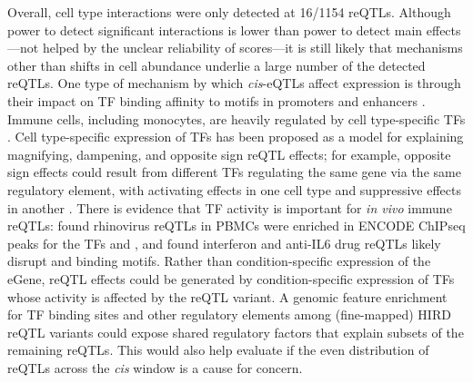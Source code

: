 Overall, cell type interactions were only detected at \num{16/1154} \glspl{reQTL}.
Although power to detect significant interactions is lower than power to detect main effects---not helped by the unclear reliability of  scores---it is still likely that mechanisms other than shifts in cell abundance underlie a large number of the detected \glspl{reQTL}.
One type of mechanism by which \textit{cis}-\glspl{eQTL} affect expression is through their impact on \gls{TF} binding affinity to motifs in promoters and enhancers \autocite{pai2015GeneticMechanisticBasis}.
Immune cells, including monocytes, are heavily regulated by cell type-specific \glspl{TF} \autocite{choudhury2016IdentifyingCellTypeSpecific}.
Cell type-specific expression of \glspl{TF} has been proposed as a model for explaining magnifying, dampening, and opposite sign \gls{reQTL} effects;
for example, opposite sign effects could result from different \glspl{TF} regulating the same gene via the same regulatory element, 
with activating effects in one cell type and suppressive effects in another \autocite{fu2012UnravelingRegulatoryMechanisms}.
There is evidence that \gls{TF} activity is important for \textit{in vivo} immune \glspl{reQTL}:
\textcite{caliskan2015HostGeneticVariation} found rhinovirus \glspl{reQTL} in \glspl{PBMC} were enriched in ENCODE \gls{ChIPseq} peaks for the \glspl{TF}  and ,
and \textcite{davenport2018DiscoveringVivoCytokineeQTL} found interferon and anti-IL6 drug \glspl{reQTL} likely disrupt  and  binding motifs.
Rather than condition-specific expression of the eGene, 
\gls{reQTL} effects could be generated by condition-specific expression of \glspl{TF} whose activity is affected by the \gls{reQTL} variant.
A genomic feature enrichment for \gls{TF} binding sites and other regulatory elements among (fine-mapped) \gls{HIRD} \gls{reQTL} variants could expose shared regulatory factors that explain subsets of the remaining \glspl{reQTL}.
This would also help evaluate if the even distribution of \glspl{reQTL} across the \textit{cis} window is a cause for concern.



